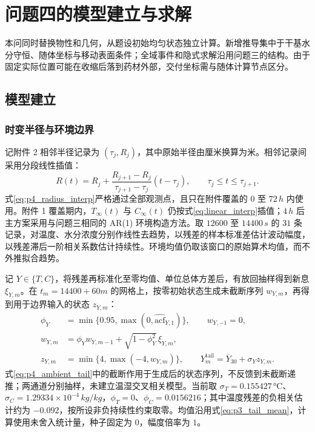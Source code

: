 \documentclass[withoutpreface,bwprint]{cumcmthesis}
\begin{document}
\section{问题四的模型建立与求解}

本问同时替换物性和几何，从题设初始均匀状态独立计算。新增推导集中于干基水分守恒、随体坐标与移动表面条件；全域事件和隐式求解沿用问题三的结构。由于固定实际位置可能在收缩后落到药材外部，交付坐标需与随体计算节点区分。

\subsection{模型建立}

\subsubsection{时变半径与环境边界}

记附件 2 相邻半径记录为 $(\tau_j,R_j)$，其中原始半径由厘米换算为米。相邻记录间采用分段线性插值：
\begin{equation}
R(t)=R_j+\frac{R_{j+1}-R_j}{\tau_{j+1}-\tau_j}(t-\tau_j),
\qquad \tau_j\le t\le\tau_{j+1}.
\label{eq:p4_radius_interp}
\end{equation}
式\eqref{eq:p4_radius_interp}严格通过全部观测点，且只在附件覆盖的 $0$ 至 $72\,\si{h}$ 内使用。附件 1 覆盖期内，$T_\infty(t)$ 与 $C_\infty(t)$ 仍按式\eqref{eq:linear_interp}插值；$4\,\si{h}$ 后主方案采用与问题三相同的 AR(1) 环境构造方法。取 $12600$ 至 $14400\,\si{s}$ 的 $31$ 条记录，对温度、水分浓度分别作线性去趋势，以残差的样本标准差估计波动幅度，以残差滞后一阶相关系数估计持续性。环境均值仍取该窗口的原始算术均值，而不外推拟合趋势。

记 $Y\in\{T,C\}$，将残差再标准化至零均值、单位总体方差后，有放回抽样得到新息 $\xi_{Y,m}$。在 $t_m=14400+60m$ 的网格上，按零初始状态生成未截断序列 $w_{Y,m}$，再得到用于边界输入的状态 $z_{Y,m}$：
\begin{equation}
\begin{aligned}
\phi_Y&=\min\{0.95,\max(0,\widehat{\mathrm{acf}}_{Y,1})\},\qquad w_{Y,-1}=0,\\
w_{Y,m}&=\phi_Yw_{Y,m-1}+\sqrt{1-\phi_Y^2}\,\xi_{Y,m},\\
z_{Y,m}&=\min\{4,\max(-4,w_{Y,m})\},\qquad
Y^{\mathrm{tail}}_m=\overline Y_{30}+\sigma_Yz_{Y,m}.
\end{aligned}
\label{eq:p4_ambient_tail}
\end{equation}
式\eqref{eq:p4_ambient_tail}中的截断作用于生成后的状态序列，不反馈到未截断递推；两通道分别抽样，未建立温湿交叉相关模型。当前取 $\sigma_T=0.155427\,\si{\celsius}$、$\sigma_C=1.29334\times10^{-4}\,\si{kg/kg}$，$\phi_T=0$、$\phi_C=0.0156216$；其中温度残差的负相关估计约为 $-0.092$，按所设非负持续性约束取零。均值沿用式\eqref{eq:p3_tail_mean}，计算使用未舍入统计量，种子固定为 $0$，幅度倍率为 $1$。
\end{document}
